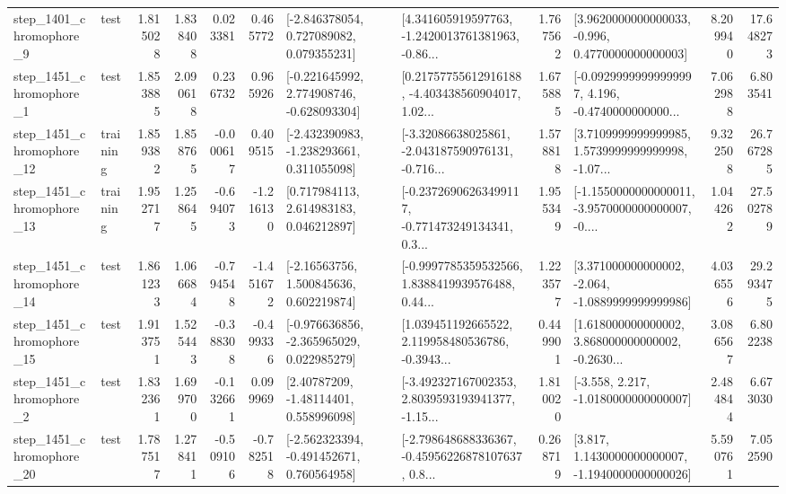 \begin{tabular}{llrrrrllrlrr}
  step\_1401\_chromophore\_9 &      test &      1.815028 &    1.838408 &      0.023381 &  0.465772 &    [-2.846378054, 0.727089082, 0.079355231] &  [4.341605919597763, -1.2420013761381963, -0.86... &       1.767562 &   [3.9620000000000033, -0.996, 0.4770000000000003] &            8.209940 &         17.648273 \\
  step\_1451\_chromophore\_1 &      test &      1.853885 &    2.090618 &      0.236732 &  0.965926 &   [-0.221645992, 2.774908746, -0.628093304] &  [0.21757755612916188, -4.403438560904017, 1.02... &       1.675885 &  [-0.09299999999999997, 4.196, -0.4740000000000... &            7.062988 &          6.803541 \\
 step\_1451\_chromophore\_12 &  training &      1.859382 &    1.858765 &     -0.000617 &  0.409515 &   [-2.432390983, -1.238293661, 0.311055098] &  [-3.32086638025861, -2.043187590976131, -0.716... &       1.578818 &  [3.7109999999999985, 1.5739999999999998, -1.07... &            9.322508 &         26.767285 \\
 step\_1451\_chromophore\_13 &  training &      1.952717 &    1.258645 &     -0.694073 & -1.216130 &     [0.717984113, 2.614983183, 0.046212897] &  [-0.23726906263499117, -0.771473249134341, 0.3... &       1.955349 &  [-1.1550000000000011, -3.9570000000000007, -0.... &            1.044262 &         27.502789 \\
 step\_1451\_chromophore\_14 &      test &      1.861233 &    1.066684 &     -0.794548 & -1.451672 &     [-2.16563756, 1.500845636, 0.602219874] &  [-0.9997785359532566, 1.8388419939576488, 0.44... &       1.223577 &   [3.371000000000002, -2.064, -1.0889999999999986] &            4.036556 &         29.293475 \\
 step\_1451\_chromophore\_15 &      test &      1.913751 &    1.525443 &     -0.388308 & -0.499336 &   [-0.976636856, -2.365965029, 0.022985279] &  [1.039451192665522, 2.119958480536786, -0.3943... &       0.449901 &  [1.618000000000002, 3.868000000000002, -0.2630... &            3.086567 &          6.802238 \\
  step\_1451\_chromophore\_2 &      test &      1.832361 &    1.699700 &     -0.132661 &  0.099969 &      [2.40787209, -1.48114401, 0.558996098] &  [-3.492327167002353, 2.8039593193941377, -1.15... &       1.810020 &               [-3.558, 2.217, -1.0180000000000007] &            2.484844 &          6.673030 \\
 step\_1451\_chromophore\_20 &      test &      1.787517 &    1.278411 &     -0.509106 & -0.782518 &   [-2.562323394, -0.491452671, 0.760564958] &  [-2.798648688336367, -0.45956226878107637, 0.8... &       0.268719 &   [3.817, 1.1430000000000007, -1.1940000000000026] &            5.590761 &          7.052590 \\

\end{tabular}
